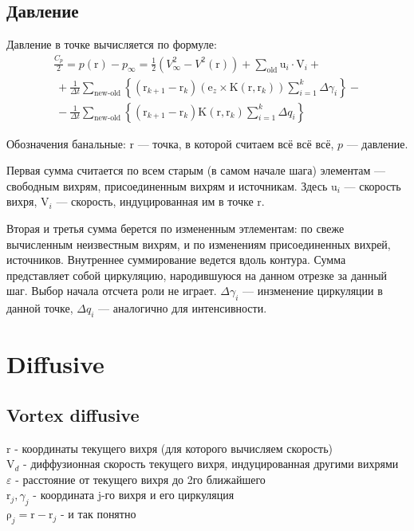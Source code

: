 \documentclass[11pt]{article}
\newcommand{\br}[1]{\boldsymbol{\mathrm{#1}}}
\begin{document}
\subsection{Давление}
Давление в точке вычисляется по формуле:
\begin{multline*}
\frac{C_p}{2} = p(\br r) - p_\infty = \frac{1}{2} \left( V^2_\infty - V^2(\br r) \right) 
+\sum\limits_\text{old}{\br u_i \cdot \br V_i} + \\
\
+\frac{1}{\Delta t}\sum\limits_\text{new-old}
{\left\lbrace\left( \br r_{k+1} - \br r_k \right)\left( \br e_z \times \br K(\br r, \br r_k) \right)
\sum_{i=1}^k{\Delta\gamma_i}\right\rbrace} - \\
\
- \frac{1}{\Delta t}\sum\limits_\text{new-old}
{\left\lbrace\left( \br r_{k+1} - \br r_k \right)
\br K(\br r, \br r_k) \sum_{i=1}^k{\Delta q_i}\right\rbrace}
\end{multline*}

Обозначения банальные: $\br r$ --- точка, в которой считаем всё всё всё,
$p$ --- давление.

Первая сумма считается по всем старым (в самом начале шага) элементам ---
свободным вихрям, присоединенным вихрям и источникам. Здесь
$\br u_i$ --- скорость вихря,
$\br V_i$ --- скорость, индуцированная им в точке $\br r$.

Вторая и третья сумма берется по измененным этлементам: по свеже 
вычисленным неизвестным вихрям, и по изменениям присоединенных вихрей, источников.
Внутреннее суммирование ведется вдоль контура. Сумма представляет собой циркуляцию,
народившуюся на данном отрезке за данный шаг. Выбор начала отсчета роли не играет.
$\Delta \gamma_i$ --- инзменение циркуляции в данной точке,
$\Delta q_i$ --- аналогично для интенсивности.


\newpage
\section{Diffusive}
\subsection{Vortex diffusive}

$\br r$ - координаты текущего вихря (для которого вычисляем скорость) \\
$\br V_d$ - диффузионная скорость текущего вихря, индуцированная другими вихрями \\
$\varepsilon$ - расстояние от текущего вихря до 2го ближайшего \\
$\br r_j, \gamma_j$ - координата j-го вихря и его циркуляция \\
$\br\rho_j = \br r - \br r_j$ - и так понятно \\
\end{document}
